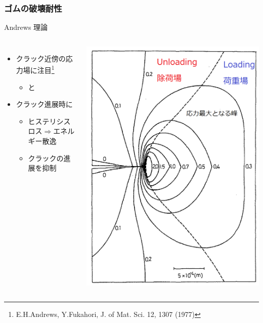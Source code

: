 \documentclass[12pt, dvipdfmx]{beamer}
\begin{document}
\begin{frame}
	\frametitle{ゴムの破壊耐性}
		\begin{exampleblock}{Andrews 理論}
			\begin{columns}[T, onlytextwidth]
				\begin{itemize}
					\item クラック近傍の応力場に注目\footnote{
						\scriptsize
			{E.H.Andrews, Y.Fukahori, J. of Mat. Sci. 12, 1307 (1977)}
					}
						\begin{itemize}
							\item \color{blue}{Loading 場}と \color{red}{Unloading 場}
						\end{itemize}
					\item クラック進展時に\color{green}{応力場が遷移}
						\begin{itemize}
							\item ヒステリシスロス$\Rightarrow${エネルギー散逸}
							\item クラックの進展を\alert{抑制}
						\end{itemize}
				\end{itemize}
					\begin{center}
						\includegraphics[width=.85\textwidth]{crack.png}

\end{center}
\end{columns}
\end{exampleblock}
\end{frame}
\end{document}
